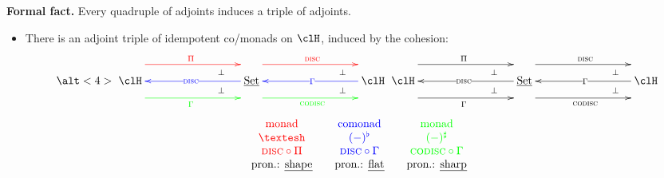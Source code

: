 \documentclass[presentation]{beamer}
\begin{document}
\begin{frame}
	\begin{block}{}
		\textbf{Formal fact.} Every quadruple of adjoints induces a triple of adjoints.
	\end{block}
	\onslide<+->
	\begin{itemize}
		\item<+-> There is an adjoint triple of idempotent co/monads on $\clH$, induced by the cohesion:
		      \[
			      \alt<4>{
			      \xymatrix@C=3cm{
			      \clH
			      \ar@{}@<8pt>[r]|(.75)\perp
			      \ar@{}@<-8pt>[r]|(.75)\perp
			      \ar@[red]@<15pt>[r]^{\color{red}\Pi}
			      \ar@[blue]@{<-}[r]|{\color{blue}\disc}
			      \ar@[green]@<-15pt>[r]_{\color{green}\Gamma}
			      &
			      \Set
			      \ar@{}@<8pt>[r]|(.75)\perp
			      \ar@{}@<-8pt>[r]|(.75)\perp
			      \ar@[red]@<15pt>[r]^{\color{red}\disc}
			      \ar@[blue]@{<-}[r]|{\color{blue}\Gamma}
			      \ar@[green]@<-15pt>[r]_{\color{green}\codisc}
			      &
			      \clH}
			      }{\xymatrix@C=3cm{
			      \clH
			      \ar@{}@<8pt>[r]|(.75)\perp
			      \ar@{}@<-8pt>[r]|(.75)\perp
			      \ar@<15pt>[r]^\Pi
			      \ar@{<-}[r]|\disc
			      \ar@<-15pt>[r]_\Gamma &
			      \Set
			      \ar@{}@<8pt>[r]|(.75)\perp
			      \ar@{}@<-8pt>[r]|(.75)\perp
			      \ar@<15pt>[r]^\disc
			      \ar@{<-}[r]|\Gamma
			      \ar@<-15pt>[r]_\codisc & \clH
			      }}
		      \]
		      \[
			      \begin{array}{ccccc}
				      {\color{red}\text{monad}}    &  &
				      {\color{blue}\text{comonad}} &  &
				      {\color{green}\text{monad}}                                           \\

				      {\color{red}\shape}          &  &
				      {\color{blue}(-)^\flat}      &  &
				      {\color{green}(-)^\sharp}                                             \\

				      {\color{red}\disc\circ\Pi}
				                                   &  & {\color{blue}\disc\circ\Gamma} &  &
				      {\color{green}\codisc\circ\Gamma}                                     \\

				      \text{pron.: \emph{shape}}   &  &
				      \text{pron.: \emph{flat}}    &  &
				      \text{pron.: \emph{sharp}}
			      \end{array}
		      \]
	\end{itemize}
\end{frame}
\end{document}
